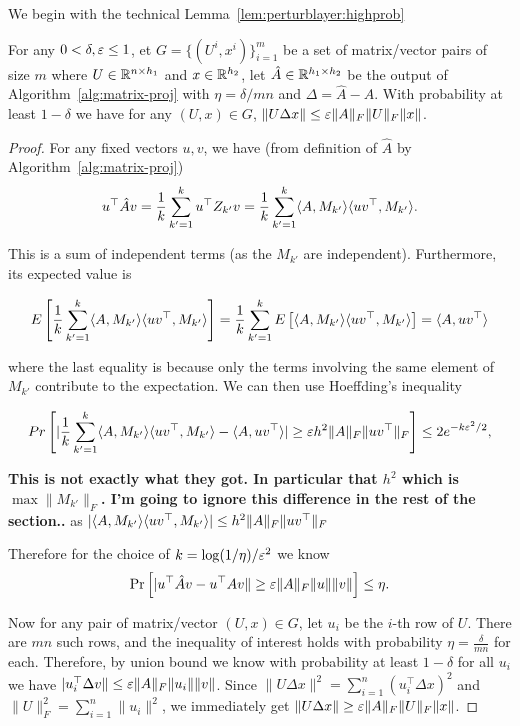 We begin with the technical Lemma~\ref{lem:perturblayer:highprob}

\begin{lemma}\label{lem:perturblayer:highprob}
For any $0<\delta,\eps\leq 1$, et $G=\{(U^i,x^i)\}_{i=1}^m$ be a set of matrix/vector pairs of size $m$ where $U\in\mathbb{R}^{n\times h_1}$ and $x\in\mathbb{R}^{h_2}$, let $\hat{A}\in \mathbb{R}^{h_1\times h_2}$ be the output of Algorithm~\ref{alg:matrix-proj} with $\eta = \delta/mn$ and $\Delta = \hat{A} - A$. With probability at least $1-\delta$ we have for any $(U,x)\in G$, $\|U \Delta x\| \leq \eps\|A\|_F\|U\|_F\|x\|$.
\end{lemma}

\begin{proof}
For any fixed vectors $u,v$, we have (from definition of $\hat{A}$ by Algorithm~\ref{alg:matrix-proj})
$$
u^\top \hat{A}v = \frac{1}{k}\sum_{k'=1}^k u^\top Z_{k'} v = \frac{1}{k} \sum_{k'=1}^k \langle A,M_{k'} \rangle\langle uv^\top, M_{k'} \rangle.
$$

This is a sum of independent terms (as the $M_{k'}$ are independent). Furthermore, its expected value is 

\begin{align*}
E\left[ \frac{1}{k} \sum_{k'=1}^k \langle A,M_{k'} \rangle\langle uv^\top, M_{k'} \rangle \right] =
 \frac{1}{k} \sum_{k'=1}^k E\left[ \langle A,M_{k'} \rangle\langle uv^\top, M_{k'} \rangle \right] = \langle A,uv^\top \rangle
 \end{align*}
 
 where the last equality is because only the terms involving the same element of $M_{k'}$ contribute to the expectation. We can then use Hoeffding's inequality
 
 $$Pr\left[ | \frac{1}{k} \sum_{k'=1}^k \inner{A,M_{k'}}\inner{uv^\top, M_{k'}} - \inner{A,uv^\top}| \geq \eps h^2 \|A\|_F \|uv^\top\|_F \right] \leq 2 e^{-k \eps^2/2},$$
 
\textbf{This is not exactly what they got. In particular that $h^2$ which is $\max{\|M_{k'}\|_F}$. I'm going to ignore this difference in the rest of the section..} as $|\langle A,M_{k'} \rangle\langle uv^\top, M_{k'} \rangle| \leq h^2 \|A\|_F \|uv^\top\|_F $

Therefore for the choice of $k=\log(1/\eta)/\eps^2$ we know
    $$\Pr\left[|u^\top \hat{A} v - u^\top Av\| \ge \eps\|A\|_F\|u\|\|v\|
    \right] \le \eta.$$

    Now for any pair of matrix/vector $(U,x)\in G$, let $u_i$ be the $i$-th row of $U$. There are $mn$ such rows, and the inequality of interest holds with probability $\eta=\frac{\delta}{mn}$ for each. Therefore, by union bound we know with probability at least $1-\delta$ for all $u_i$ we have $|u_i^\top \Delta v\| \le \eps\|A\|_F\|u_i\|\|v\|$. Since $\|U\Delta x\|^2 = \sum_{i=1}^n (u_i^\top \Delta x)^2$ and $\|U\|_F^2 = \sum_{i=1}^n \|u_i\|^2$, we immediately get
    $\|U \Delta x\| \ge \eps\|A\|_F\|U\|_F\|x\|$.


\end{proof}

